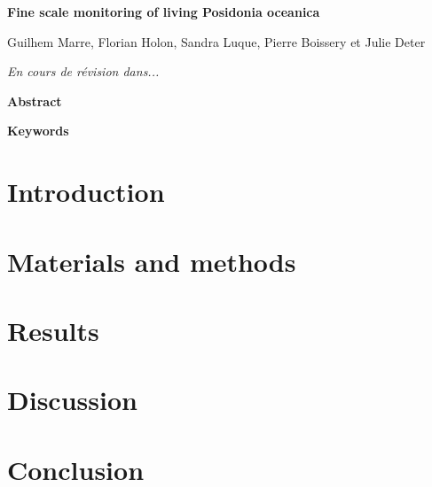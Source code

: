\clearpage

\noindent\textbf{Fine scale monitoring of living Posidonia oceanica}

\noindent Guilhem Marre, Florian Holon, Sandra Luque, Pierre Boissery et Julie Deter

\noindent\textit{En cours de révision dans...}

\noindent\textbf{Abstract}


\noindent\textbf{Keywords}


\section{Introduction}\label{chapitre4_1}

\section{Materials and methods}\label{chapitre4_2}

\section{Results}\label{chapitre4_3}

\section{Discussion}\label{chapitre4_4}

\section{Conclusion}\label{chapitre4_5}
